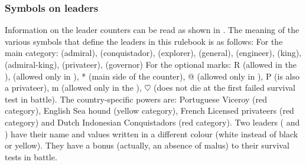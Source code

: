 \subsubsection{Symbols on leaders}
\aparag Information on the leader counters can be read as shown in
.
\aparag \hypertarget{link-meaning-leaders}{The meaning} of the various symbols
that define the leaders in this rulebook is as follows:
\bparag For the main category: \LeaderA (admiral), \LeaderC (conquistador),
\LeaderE (explorer), \LeaderG (general), \LeaderI (engineer), \LeaderK (king),
\Leaderd (admiral-king), \LeaderP (privateer), \LeaderGov (governor)
\bparag For the optional marks: R (allowed in the \ROTW), \textdollar{}
(allowed only in \continentAmerica), * (main side of the counter), @ (allowed
only in \continentAsia), P (is also a privateer), m (allowed only in the
\regionMediterranee), $\heartsuit$ (does not die at the first failed survival
test in battle).
\bparag The country-specific powers are: Portuguese Viceroy (red category),
English Sea hound (yellow category), French Licensed privateers (red category)
and Dutch Indonesian Conquistadors (red category).
\bparag Two leaders ( and ) have
their name and values written in a different colour (white instead of black or
yellow). They have a bonus (actually, an absence of malus) to their survival
tests in battle.


